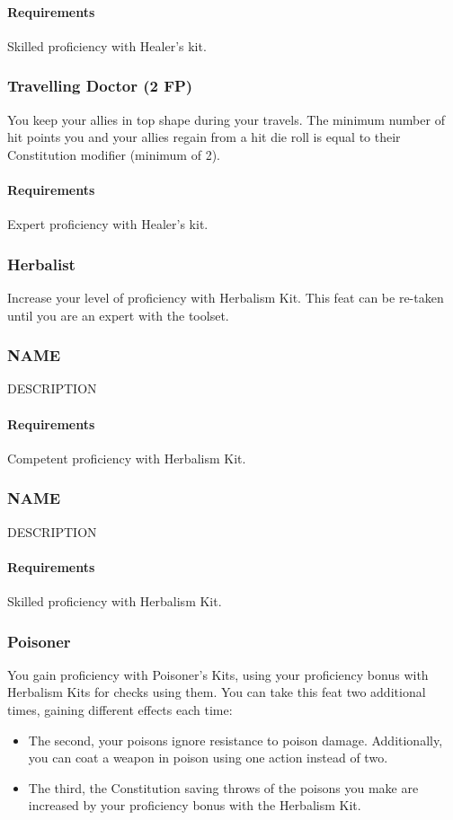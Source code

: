     \paragraph{Requirements} Skilled proficiency with Healer's kit.
\subsubsection{Travelling Doctor (2 FP)} \label{feat::travellingdoctor}
    You keep your allies in top shape during your travels.
    The minimum number of hit points you and your allies regain from a hit die roll is equal to their Constitution modifier (minimum of 2).
    \paragraph{Requirements} Expert proficiency with Healer's kit.
\subsubsection{Herbalist} \label{feat::herbalist}
    Increase your level of proficiency with Herbalism Kit.
    This feat can be re-taken until you are an expert with the toolset.
\subsubsection{NAME} \label{feat::name}
    DESCRIPTION
    \paragraph{Requirements} Competent proficiency with Herbalism Kit.
\subsubsection{NAME} \label{feat::name}
    DESCRIPTION
    \paragraph{Requirements} Skilled proficiency with Herbalism Kit.
\subsubsection{Poisoner} \label{feat::poisoner}
    You gain proficiency with Poisoner's Kits, using your proficiency bonus with Herbalism Kits for checks using them.
    You can take this feat two additional times, gaining different effects each time:
    \begin{itemize}
        \item The second, your poisons ignore resistance to poison damage.
        Additionally, you can coat a weapon in poison using one action instead of two.
        \item The third, the Constitution saving throws of the poisons you make are increased by your proficiency bonus with the Herbalism Kit.
    \end{itemize}
